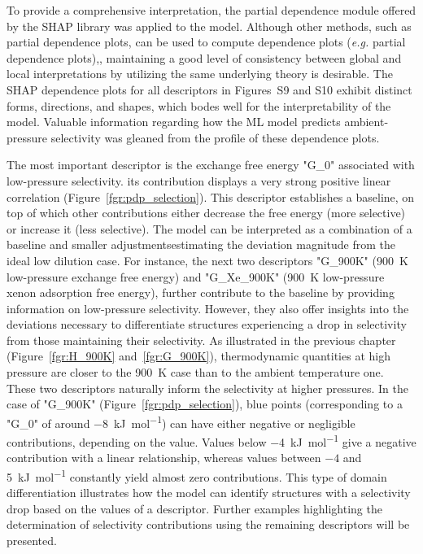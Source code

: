 \documentclass[main]{subfiles}
\begin{document}
To provide a comprehensive interpretation, the partial dependence module offered by the SHAP library was applied to the model. Although other methods, such as partial dependence plots, can be used to compute dependence plots (\emph{e.g.} partial dependence plots),\autocite{molnar2020interpretable}, maintaining a good level of consistency between global and local interpretations by utilizing the same underlying theory is desirable. The SHAP dependence plots for all descriptors in Figures~S9 and S10 exhibit distinct forms, directions, and shapes, which bodes well for the interpretability of the model. Valuable information regarding how the ML model predicts ambient-pressure selectivity was gleaned from the profile of these dependence plots.

The most important descriptor is the exchange free energy "G\_0" associated with low-pressure selectivity. its contribution displays a very strong positive linear correlation (Figure~\ref{fgr:pdp_selection}). This descriptor establishes a baseline, on top of which other contributions either decrease the free energy (more selective) or increase it (less selective). The model can be interpreted as a combination of a baseline and smaller adjustmentsestimating the deviation magnitude from the ideal low dilution case. For instance, the next two descriptors "G\_900K" (\SI{900}{\kelvin} low-pressure exchange free energy) and "G\_Xe\_900K" (\SI{900}{\kelvin} low-pressure xenon adsorption free energy), further contribute to the baseline by providing information on low-pressure selectivity. However, they also offer insights into the deviations necessary to differentiate structures experiencing a drop in selectivity from those maintaining their selectivity. As illustrated in the previous chapter (Figure~\ref{fgr:H_900K} and~\ref{fgr:G_900K}), thermodynamic quantities at high pressure are closer to the \SI{900}{\kelvin} case than to the ambient temperature one. These two descriptors naturally inform the selectivity at higher pressures. In the case of "G\_900K" (Figure~\ref{fgr:pdp_selection}), blue points (corresponding to a "G\_0" of around \SI{-8}{\kilo\joule\per\mole}) can have either negative or negligible contributions, depending on the value. Values below \SI{-4}{\kilo\joule\per\mole} give a negative contribution with a linear relationship, whereas values between $-4$ and \SI{5}{\kilo\joule\per\mole} constantly yield almost zero contributions. This type of domain differentiation illustrates how the model can identify structures with a selectivity drop based on the values of a descriptor. Further examples highlighting the determination of selectivity contributions using the remaining descriptors will be presented.
\end{document}
